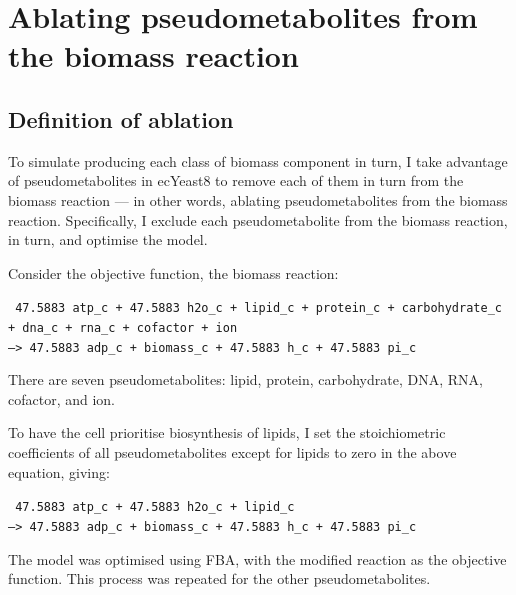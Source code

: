\section{Ablating pseudometabolites from the biomass reaction}
\label{sec:model-yeast8-pseudometabolites}

\subsection{Definition of ablation}
\label{sec:model-yeast8-pseudometabolites-def}

To simulate producing each class of biomass component in turn,
I take advantage of pseudometabolites in ecYeast8 to remove each of them in turn from the biomass reaction ---
in other words, ablating pseudometabolites from the biomass reaction.
Specifically, I exclude each pseudometabolite from the biomass reaction, in turn, and optimise the model.

Consider the objective function, the biomass reaction:

\texttt{
  47.5883 atp\_c + 47.5883 h2o\_c + lipid\_c + protein\_c + carbohydrate\_c\\
  + dna\_c + rna\_c + cofactor + ion \\
  --> 47.5883 adp\_c + biomass\_c + 47.5883 h\_c + 47.5883 pi\_c
}

There are seven pseudometabolites: lipid, protein, carbohydrate, DNA, RNA, cofactor, and ion.

To have the cell prioritise biosynthesis of lipids, I set the stoichiometric coefficients of all pseudometabolites except for lipids to zero in the above equation, giving:

\texttt{
  47.5883 atp\_c + 47.5883 h2o\_c + lipid\_c \\
  --> 47.5883 adp\_c + biomass\_c + 47.5883 h\_c + 47.5883 pi\_c
}

The model was optimised using FBA, with the modified reaction as the objective function.
This process was repeated for the other pseudometabolites.

